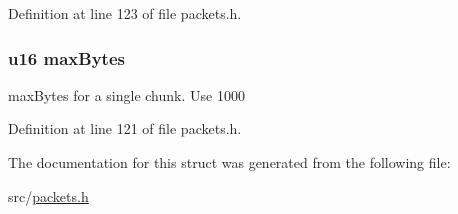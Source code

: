 Definition at line 123 of file packets.\+h.

\hypertarget{struct_b_e_g_i_n___u_p_l_o_a_d_ab90bb8e65738c294ff6c9400ea3f4b41}{}
\subsubsection[{max\+Bytes}]{ {\bf u16} max\+Bytes}\label{struct_b_e_g_i_n___u_p_l_o_a_d_ab90bb8e65738c294ff6c9400ea3f4b41}
max\+Bytes for a single chunk. Use 1000 

Definition at line 121 of file packets.\+h.



The documentation for this struct was generated from the following file\+:\begin{DoxyCompactItemize}
\item 
src/\hyperlink{packets_8h}{packets.\+h}\end{DoxyCompactItemize}

